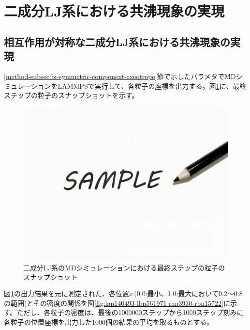 \documentclass[titlepage]{jsreport}
\begin{document}
\section{二成分LJ系における共沸現象の実現} \label{results-sec:bi-component-azeotrope}
\subsection{相互作用が対称な二成分LJ系における共沸現象の実現} \label{results-subsec:bi-symmetric-component-azeotrope}
\ref{method-subsec:bi-symmetric-component-azeotrope}節で示したパラメタでMDシミュレーションをLAMMPSで実行して、各粒子の座標を出力する。図\ref{fig:lan140493-lbn561971-ran3930-rbn15722-last}に、最終ステップの粒子のスナップショットを示す。

\begin{figure}[htbp]
    \begin{center}
        \includegraphics[width=14cm]{fig/sample.jpeg}
    \end{center}
    \caption{二成分LJ系のMDシミュレーションにおける最終ステップの粒子のスナップショット}
    \label{fig:lan140493-lbn561971-ran3930-rbn15722-last}
\end{figure}

\newpage
図\ref{fig:lan140493-lbn561971-ran3930-rbn15722-last}の出力結果を元に測定された、各位置$x$\,(0.0:最小、1.0:最大において0.2〜0.8の範囲)とその密度の関係を図\ref{fig:lan140493-lbn561971-ran3930-rbn15722}に示す。ただし、各粒子の密度は、最後の1000000ステップから1000ステップ刻みに各粒子の位置座標を出力した1000個の結果の平均を取るものとする。
\end{document}
